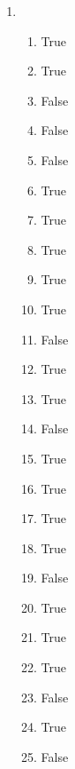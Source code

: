 \documentclass[12pt]{article}
\begin{document}
\begin{enumerate}[itemsep=6mm]
		\item \begin{enumerate}[label=(\alph*),listparindent=6mm,itemsep=3mm]
			\item True
			\item True
			\item False
			\item False
			\item False
			\item True
			\item True
			\item True
			\item True
			\item True
			\item False
			\item True
			\item True
			\item False
			\item True
			\item True
			\item True
			\item True
			\item False
			\item True
			\item True
			\item True
			\item False 
			\item True
			\item False
		\end{enumerate}
	\end{enumerate}
\end{document}
